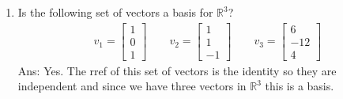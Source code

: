 \documentclass[10pt, a4paper]{article}
\theoremstyle{break}
\begin{document}
\begin{enumerate}
\item Is the following set of vectors a basis for $\mathbb{R}^3$?
\begin{align}
v_1=\begin{bmatrix} 1 \\ 0 \\1 \end{bmatrix} \qquad v_2=\begin{bmatrix} 1 \\ 1 \\ -1 \end{bmatrix} \qquad v_3=\begin{bmatrix} 6 \\ -12\\ 4 \end{bmatrix}
\end{align}
Ans: Yes. The rref of this set of vectors is the identity so they are independent and since we have three vectors in $\mathbb{R}^3$ this is a basis. 

\end{enumerate}
\end{document}
